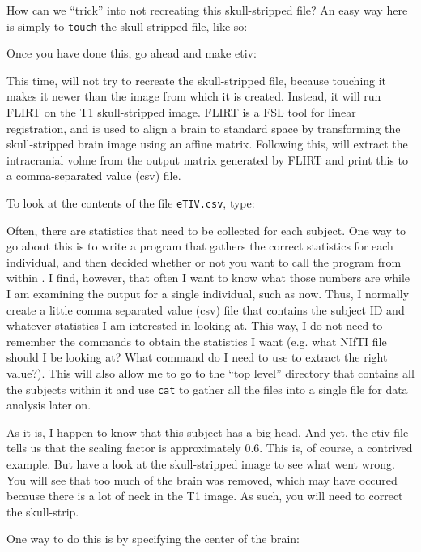 How can we ``trick'' \maken{} into not recreating this skull-stripped file? An easy way here is simply to \texttt{touch} the skull-stripped file, like so:

Once you have done this, go ahead and make etiv:

This time, \maken{} will not try to recreate the skull-stripped file, because touching it makes it newer than the image from which it is created. Instead, it will run FLIRT on the T1 skull-stripped image. FLIRT is a FSL tool for linear registration, and is used to align a brain to standard space by transforming the skull-stripped brain image using an affine matrix. Following this, \maken{} will extract the intracranial volme from the output matrix generated by FLIRT and print this to a comma-separated value (csv) file.

To look at the contents of the file \texttt{eTIV.csv}, type:

Often, there are statistics that need to be collected for each subject. One way to go about this is to write a program that gathers the correct statistics for each individual, and then decided whether or not you want to call the program from within \maken{}. I find, however, that often I want to know what those numbers are while I am examining the output for a single individual, such as now. Thus, I normally create a little comma separated value (csv) file that contains the subject ID and whatever statistics I am interested in looking at. This way, I do not need to remember the commands to obtain the statistics I want (e.g. what NIfTI file should I be looking at? What command do I need to use to extract the right value?). This will also allow me to go to the ``top level'' directory that contains all the subjects within it and use \texttt{cat} to gather all the files into a single file for data analysis later on.

As it is, I happen to know that this subject has a big head. And yet, the etiv file tells us that the scaling factor is approximately 0.6. This is, of course, a contrived example. But have a look at the skull-stripped image to see what went wrong. You will see that too
much of the brain was removed, which may have occured because there is a lot of neck in the T1 image.
As such, you will need to correct the skull-strip.

One way to do this is by specifying the center of the brain:

